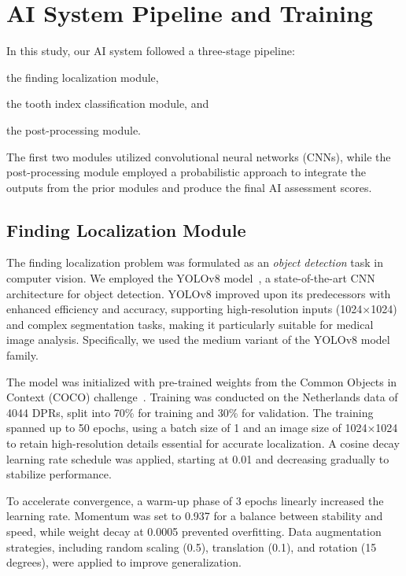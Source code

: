 \section{AI System Pipeline and Training}
\label{sec:ai-system-pipeline}

In this study, our AI system followed a three-stage pipeline:
\begin{enumerate*}[label=(\alph*)]
    \item the finding localization module,
    \item the tooth index classification module, and
    \item the post-processing module.
\end{enumerate*}
The first two modules utilized convolutional neural networks (CNNs), while the post-processing module employed a probabilistic approach to integrate the outputs from the prior modules and produce the final AI assessment scores.

\subsection{Finding Localization Module}
The finding localization problem was formulated as an \emph{object detection} task in computer vision. 
We employed the YOLOv8 model~\citep{varghese2024yolov8}, a state-of-the-art CNN architecture for object detection.
YOLOv8 improved upon its predecessors with enhanced efficiency and accuracy, supporting high-resolution inputs (1024×1024) and complex segmentation tasks, making it particularly suitable for medical image analysis.
Specifically, we used the medium variant of the YOLOv8 model family.

The model was initialized with pre-trained weights from the Common Objects in Context (COCO) challenge~\citep{lin2014microsoft}.
Training was conducted on the Netherlands data of \num{4044} DPRs, split into 70\% for training and 30\% for validation.
The training spanned up to \num{50} epochs, using a batch size of 1 and an image size of 1024×1024 to retain high-resolution details essential for accurate localization.
A cosine decay learning rate schedule was applied, starting at \num{0.01} and decreasing gradually to stabilize performance.

To accelerate convergence, a warm-up phase of 3 epochs linearly increased the learning rate.
Momentum was set to 0.937 for a balance between stability and speed, while weight decay at 0.0005 prevented overfitting.
Data augmentation strategies, including random scaling (0.5), translation (0.1), and rotation (15 degrees), were applied to improve generalization.

